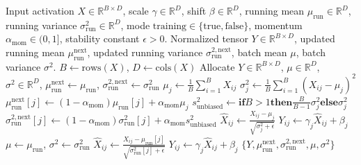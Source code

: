 \documentclass[11pt,a4paper]{article}
\theoremstyle{definition}
\begin{document}
\begin{algorithm}[H]
\caption{Batch Normalization Forward Pass and Statistical Update}
\label{alg:batch_norm}
\begin{algorithmic}[1]
\Require Input activation $X \in \mathbb{R}^{B \times D}$, scale $\gamma \in \mathbb{R}^D$, shift $\beta \in \mathbb{R}^D$, running mean $\mu_{\text{run}} \in \mathbb{R}^D$, running variance $\sigma_{\text{run}}^2 \in \mathbb{R}^D$, mode $\text{training} \in \{\text{true}, \text{false}\}$, momentum $\alpha_{\text{mom}} \in (0, 1]$, stability constant $\epsilon > 0$.
\Ensure Normalized tensor $Y \in \mathbb{R}^{B \times D}$, updated running mean $\mu_{\text{run}}^{\text{next}}$, updated running variance $\sigma_{\text{run}}^{2, \text{next}}$, batch mean $\mu$, batch variance $\sigma^2$.
\State $B \gets \text{rows}(X)$, $D \gets \text{cols}(X)$
\State Allocate $Y \in \mathbb{R}^{B \times D}$, $\mu \in \mathbb{R}^D$, $\sigma^2 \in \mathbb{R}^D$, $\mu_{\text{run}}^{\text{next}} \gets \mu_{\text{run}}$, $\sigma_{\text{run}}^{2, \text{next}} \gets \sigma_{\text{run}}^2$
        \State $\mu_j \gets \frac{1}{B} \sum_{i=1}^B X_{ij}$
        \State $\sigma_j^2 \gets \frac{1}{B} \sum_{i=1}^B (X_{ij} - \mu_j)^2$
        \State $\mu_{\text{run}}^{\text{next}}[j] \gets (1 - \alpha_{\text{mom}}) \mu_{\text{run}}[j] + \alpha_{\text{mom}} \mu_j$
        \State $s_{\text{unbiased}}^2 \gets \mathbf{if } B > 1 \mathbf{ then } \frac{B}{B-1} \sigma_j^2 \mathbf{ else } \sigma_j^2$
        \State $\sigma_{\text{run}}^{2, \text{next}}[j] \gets (1 - \alpha_{\text{mom}}) \sigma_{\text{run}}^2[j] + \alpha_{\text{mom}} s_{\text{unbiased}}^2$
    \EndFor
            \State $\hat{X}_{ij} \gets \frac{X_{ij} - \mu_j}{\sqrt{\sigma_j^2 + \epsilon}}$
            \State $Y_{ij} \gets \gamma_j \hat{X}_{ij} + \beta_j$
        \EndFor
    \EndFor
\Else
    \State $\mu \gets \mu_{\text{run}}$, $\sigma^2 \gets \sigma_{\text{run}}^2$
            \State $\hat{X}_{ij} \gets \frac{X_{ij} - \mu_{\text{run}}[j]}{\sqrt{\sigma_{\text{run}}^2[j] + \epsilon}}$
            \State $Y_{ij} \gets \gamma_j \hat{X}_{ij} + \beta_j$
        \EndFor
    \EndFor
\EndIf
\State \Return $\{Y, \mu_{\text{run}}^{\text{next}}, \sigma_{\text{run}}^{2, \text{next}}, \mu, \sigma^2\}$
\end{algorithmic}
\end{algorithm}
\end{document}
